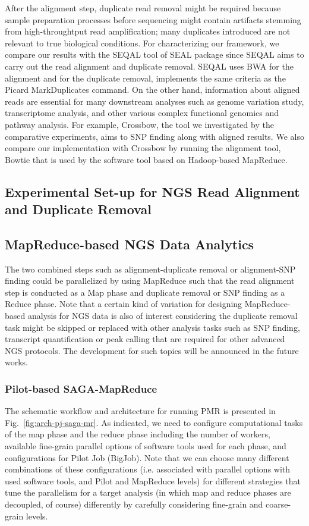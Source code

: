 \documentclass{sig-alternate}
\begin{document}
After the alignment step, duplicate read removal might be required because sample preparation processes before sequencing might contain artifacts stemming from high-throughtput read amplification; many duplicates introduced are not relevant to true biological conditions.  For characterizing our framework, we compare our results with the SEQAL tool of SEAL package since SEQAL aims to carry out the read alignment and duplicate removal.  SEQAL uses BWA for the alignment and for the duplicate removal, implements the same criteria as the Picard MarkDuplicates command\cite{seal2011,seal_2011_mapred}.  On the other hand, information about aligned reads are essential for many downstream analyses such as genome variation study, transcriptome analysis, and other various complex functional genomics and pathway analysis.  For example, Crossbow, the tool we investigated by the comparative experiments, aims to SNP finding along with aligned results\cite{langmead2009}.  We also compare our implementation with Crossbow by running the alignment tool, Bowtie that is used by the software tool based on Hadoop-based MapReduce.

\subsection{Experimental Set-up for NGS Read Alignment and Duplicate Removal}
\subsection{MapReduce-based NGS Data Analytics}
The two combined steps such as alignment-duplicate removal or alignment-SNP finding could be parallelized by using MapReduce such that the read alignment step is conducted as a Map phase and duplicate removal or SNP finding as a Reduce phase.  Note that a certain kind of variation for designing MapReduce-based analysis for NGS data is also of interest considering the duplicate removal task might be skipped or replaced with other analysis tasks such as SNP finding, transcript quantification or peak calling that are required for other advanced NGS protocols.  The development for such topics will be announced in the future works.

\subsubsection{Pilot-based SAGA-MapReduce}
The schematic workflow and architecture for running PMR is presented in Fig.~\ref{fig:arch-pj-saga-mr}.  As indicated, we need to configure computational tasks of the map phase and the reduce phase including the number of workers, available fine-grain parallel options of software tools used for each phase, and configurations for Pilot Job (BigJob).  Note that we can choose many different combinations of these configurations (i.e. associated with parallel options with used software tools, and Pilot and MapReduce levels) for different strategies that tune the parallelism for a target analysis (in which map and reduce phases are decoupled, of course) differently by carefully considering fine-grain and coarse-grain levels.    
\end{document}
